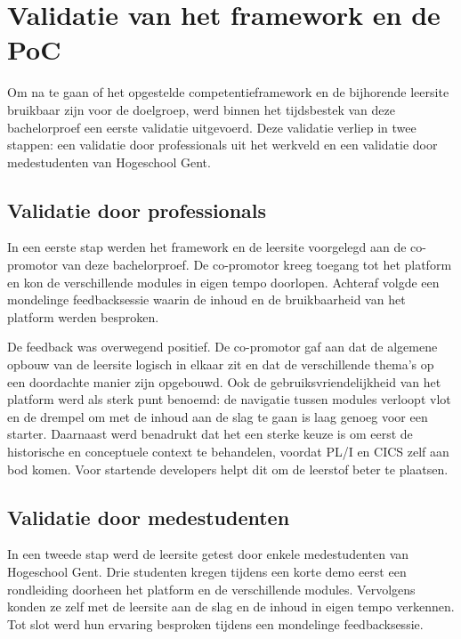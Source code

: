 \section{Validatie van het framework en de PoC}%
\label{sec:validatie-framework-poc}

Om na te gaan of het opgestelde competentieframework en de bijhorende leersite bruikbaar zijn voor de doelgroep, werd binnen het tijdsbestek van deze bachelorproef een eerste validatie uitgevoerd.
Deze validatie verliep in twee stappen: een validatie door professionals uit het werkveld en een validatie door medestudenten van Hogeschool Gent.

\subsection{Validatie door professionals}%
\label{sec:validatie-professionals}

In een eerste stap werden het framework en de leersite voorgelegd aan de co-promotor van deze bachelorproef.
De co-promotor kreeg toegang tot het platform en kon de verschillende modules in eigen tempo doorlopen.
Achteraf volgde een mondelinge feedbacksessie waarin de inhoud en de bruikbaarheid van het platform werden besproken.

De feedback was overwegend positief.
De co-promotor gaf aan dat de algemene opbouw van de leersite logisch in elkaar zit en dat de verschillende thema's op een doordachte manier zijn opgebouwd.
Ook de gebruiksvriendelijkheid van het platform werd als sterk punt benoemd: de navigatie tussen modules verloopt vlot en de drempel om met de inhoud aan de slag te gaan is laag genoeg voor een starter.
Daarnaast werd benadrukt dat het een sterke keuze is om eerst de historische en conceptuele context te behandelen, voordat PL/I en CICS zelf aan bod komen.
Voor startende developers helpt dit om de leerstof beter te plaatsen.

\subsection{Validatie door medestudenten}%
\label{sec:validatie-studenten}

In een tweede stap werd de leersite getest door enkele medestudenten van Hogeschool Gent.
Drie studenten kregen tijdens een korte demo eerst een rondleiding doorheen het platform en de verschillende modules.
Vervolgens konden ze zelf met de leersite aan de slag en de inhoud in eigen tempo verkennen.
Tot slot werd hun ervaring besproken tijdens een mondelinge feedbacksessie.

